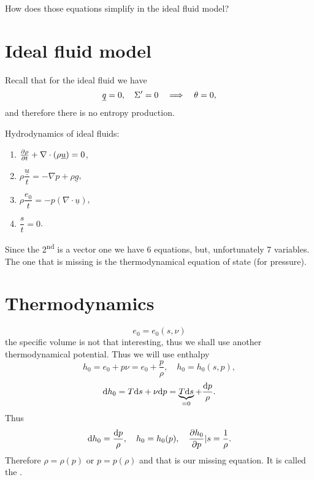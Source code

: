 \documentclass[11pt,oneside]{book}
\renewcommand{\vec}[1]{\underline{#1}}
\theoremstyle{definition} %
\theoremstyle{plain} %
\theoremstyle{remark} %
\theoremstyle{underline}
\begin{document}
  How does those equations simplify in the ideal fluid model?

  \section{Ideal fluid model}

  Recall that for the ideal fluid we have
  \begin{displaymath}
    \vec q = 0, \quad \Sigma' = 0 \qLRa \theta = 0,
  \end{displaymath}
  and therefore there is no entropy production.

  Hydrodynamics of ideal fluids:
  \begin{enumerate}
    \item $\ptf{\rho}{t} + \nabla \cdot (\rho \vec u) = 0$,
    \item $\rho \dfrac{\vec u}{t} = - \nabla p + \rho \vec g$,
    \item $ \rho \dfrac{e_0}{t} = - p(\nabla \cdot \vec u)$,
    \item $\dfrac{s}{t} = 0$.
  \end{enumerate}
  Since the 2\textsuperscript{nd} is a vector one we have $6$ equations, but, unfortunately 7 variables.
  The one that is missing is the thermodynamical equation of state (for pressure).

  \section{Thermodynamics}
  \begin{displaymath}
    e_0 = e_0(s , \nu)
  \end{displaymath}
  the specific volume is not that interesting, thus we shall use another thermodynamical potential.
  Thus we will use enthalpy
  \begin{displaymath}
    h_0 = e_0 + p \nu = e_0 + \frac{p}{\rho}, \quad h_0 = h_0(s, p), 
  \end{displaymath}
  \begin{displaymath}
    \mathrm{d} h_0 = T \mathrm{d} s + \nu \mathrm{d} p = \underbrace{T\mathrm{d} s}_{ = 0} + \frac{\mathrm{d} p}{\rho}.
  \end{displaymath}
  Thus 
  \begin{displaymath}
    \mathrm{d} h_0 = \frac{\mathrm{d} p}{\rho}, \quad h_0 = h_0(p),\quad \frac{\partial h_0}{\partial p}|s = \frac{1}{\rho}.
  \end{displaymath}
  Therefore $\rho = \rho(p)$ or $p = p(\rho)$ and that is our missing equation.
  It is called the .
  
\end{document}
